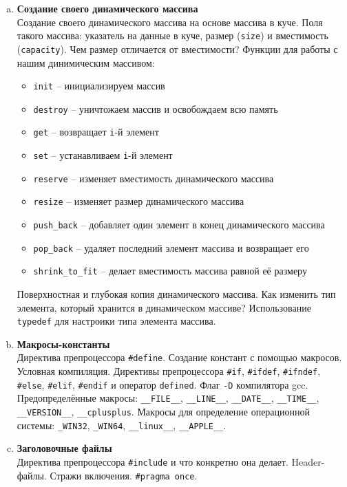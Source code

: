 \documentclass{article}
\begin{document}
\begin{enumerate}
\begin{enumerate}[a.]
\item \textbf{Создание своего динамического массива}\\
Создание своего динамического массива на основе массива в куче. Поля такого массива: указатель на данные в куче, размер (\texttt{size}) и вместимость (\texttt{capacity}). Чем размер отличается от вместимости? Функции для работы с нашим динимическим массивом:
\begin{itemize}
\item \texttt{init} -- инициализируем массив
\item \texttt{destroy} -- уничтожаем массив и освобождаем всю память
\item \texttt{get} -- возвращает \texttt{i}-й элемент
\item \texttt{set} -- устанавливаем \texttt{i}-й элемент
\item \texttt{reserve} -- изменяет вместимость динамического массива
\item \texttt{resize} -- изменяет размер динамического массива
\item \texttt{push\_back} -- добавляет один элемент в конец динамического массива
\item \texttt{pop\_back} -- удаляет последний элемент массива и возвращает его
\item \texttt{shrink\_to\_fit} -- делает вместимость массива равной её размеру
\end{itemize}
Поверхностная и глубокая копия динамического массива. 
Как изменить тип элемента, который хранится в динамическом массиве? 
Использование \texttt{typedef} для настроики типа элемента массива.

\item \textbf{Макросы-константы}\\
Директива препроцессора \texttt{\#define}. Создание констант с помощью макросов.
Условная компиляция.  Директивы препроцессора \texttt{\#if}, \texttt{\#ifdef}, \texttt{\#ifndef}, \texttt{\#else}, \texttt{\#elif}, \texttt{\#endif} и оператор \texttt{defined}. Флаг \texttt{-D} компилятора gcc. Предопределённые макросы:
\texttt{\_\_FILE\_\_}, \texttt{\_\_LINE\_\_}, \texttt{\_\_DATE\_\_}, \texttt{\_\_TIME\_\_}, \texttt{\_\_VERSION\_\_}, \texttt{\_\_cplusplus}. Макросы для определение операционной системы: \texttt{\_WIN32}, \texttt{\_WIN64}, \texttt{\_\_linux\_\_}, \texttt{\_\_APPLE\_\_}. 

\item \textbf{Заголовочные файлы}\\
Директива препроцессора \texttt{\#include} и что конкретно она делает. Header-файлы.
Стражи включения. \texttt{\#pragma once}.


\end{enumerate}
\end{enumerate}
\end{document}
